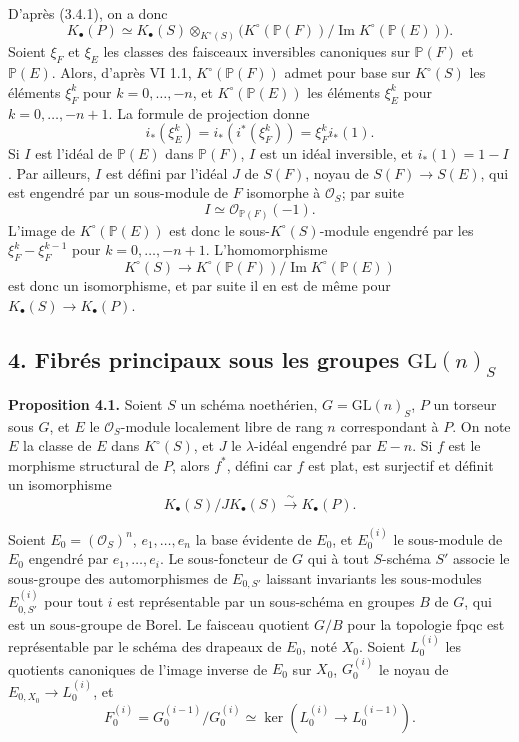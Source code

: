 \documentclass[11pt]{article}
\begin{document}
D'après (3.4.1), on a donc
\[
K_\bullet(P)\simeq K_\bullet(S)\otimes_{K^\circ(S)}
\bigl(K^\circ(\mathbb P(F))/\operatorname{Im}K^\circ(\mathbb P(E))\bigr).
\]
Soient $\xi_F$ et $\xi_E$ les classes des faisceaux inversibles canoniques sur $\mathbb P(F)$ et $\mathbb P(E)$. Alors, d'après VI 1.1, $K^\circ(\mathbb P(F))$ admet pour base sur $K^\circ(S)$ les éléments $\xi_F^k$ pour $k=0,\ldots,-n$, et $K^\circ(\mathbb P(E))$ les éléments $\xi_E^k$ pour $k=0,\ldots,-n+1$. La formule de projection donne
\[
i_*(\xi_E^k)=i_*(i^*(\xi_F^k))=\xi_F^k i_*(1).
\]
Si $I$ est l'idéal de $\mathbb P(E)$ dans $\mathbb P(F)$, $I$ est un idéal inversible, et $i_*(1)=1-I$. Par ailleurs, $I$ est défini par l'idéal $J$ de $S(F)$, noyau de $S(F)\to S(E)$, qui est engendré par un sous-module de $F$ isomorphe à $\mathcal O_S$; par suite
\[
I\simeq \mathcal O_{\mathbb P(F)}(-1).
\]
L'image de $K^\circ(\mathbb P(E))$ est donc le sous-$K^\circ(S)$-module engendré par les $\xi_F^k-\xi_F^{k-1}$ pour $k=0,\ldots,-n+1$. L'homomorphisme
\[
K^\circ(S)\longrightarrow K^\circ(\mathbb P(F))/\operatorname{Im}K^\circ(\mathbb P(E))
\]
est donc un isomorphisme, et par suite il en est de même pour $K_\bullet(S)\to K_\bullet(P)$.

\subsection*{4. Fibrés principaux sous les groupes $\mathrm{GL}(n)_S$}

\textbf{Proposition 4.1.} Soient $S$ un schéma noethérien, $G=\mathrm{GL}(n)_S$, $P$ un torseur sous $G$, et $E$ le $\mathcal O_S$-module localement libre de rang $n$ correspondant à $P$. On note $E$ la classe de $E$ dans $K^\circ(S)$, et $J$ le $\lambda$-idéal engendré par $E-n$. Si $f$ est le morphisme structural de $P$, alors $f^*$, défini car $f$ est plat, est surjectif et définit un isomorphisme
\[
K_\bullet(S)/J K_\bullet(S)\xrightarrow{\sim}K_\bullet(P).
\]

Soient $E_0=(\mathcal O_S)^n$, $e_1,\ldots,e_n$ la base évidente de $E_0$, et $E_0^{(i)}$ le sous-module de $E_0$ engendré par $e_1,\ldots,e_i$. Le sous-foncteur de $G$ qui à tout $S$-schéma $S'$ associe le sous-groupe des automorphismes de $E_{0,S'}$ laissant invariants les sous-modules $E_{0,S'}^{(i)}$ pour tout $i$ est représentable par un sous-schéma en groupes $B$ de $G$, qui est un sous-groupe de Borel. Le faisceau quotient $G/B$ pour la topologie fpqc est représentable par le schéma des drapeaux de $E_0$, noté $X_0$. Soient $L_0^{(i)}$ les quotients canoniques de l'image inverse de $E_0$ sur $X_0$, $G_0^{(i)}$ le noyau de $E_{0,X_0}\to L_0^{(i)}$, et
\[
F_0^{(i)}=G_0^{(i-1)}/G_0^{(i)}\simeq \ker(L_0^{(i)}\to L_0^{(i-1)}).
\]
\end{document}
